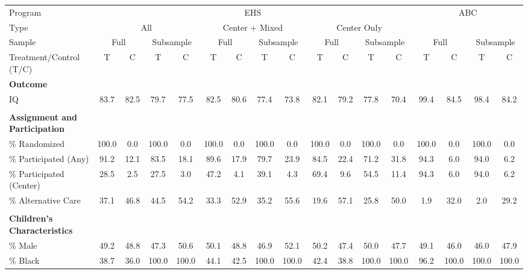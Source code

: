\begin{tabular}{lcccccccccccccccc}
\toprule 
\midrule 
Program & \multicolumn{12}{c}{EHS} & \multicolumn{4}{c}{ABC} \\
 \cmidrule(lr){1-1} \cmidrule(lr){2-13} \cmidrule(lr){14-17} 
Type & \multicolumn{4}{c}{All} & \multicolumn{4}{c}{Center $+$ Mixed} & \multicolumn{4}{c}{Center Only} & \multicolumn{4}{c}{} \\
 \cmidrule(lr){1-1} \cmidrule(lr){2-5} \cmidrule(lr){6-9} \cmidrule(lr){10-13} \cmidrule(lr){14-17} 
Sample & \multicolumn{2}{c}{Full} & \multicolumn{2}{c}{Subsample} & \multicolumn{2}{c}{Full} & \multicolumn{2}{c}{Subsample} & \multicolumn{2}{c}{Full} & \multicolumn{2}{c}{Subsample} & \multicolumn{2}{c}{Full} & \multicolumn{2}{c}{Subsample} \\
 \cmidrule(lr){1-1} \cmidrule(lr){2-3} \cmidrule(lr){4-5} \cmidrule(lr){6-7} \cmidrule(lr){8-9} \cmidrule(lr){10-11} \cmidrule(lr){12-13} \cmidrule(lr){14-15} \cmidrule(lr){16-17} 
Treatment/Control (T/C) & T & C & T & C & T & C & T & C & T & C & T & C & T & C & T & C \\
\midrule 
\textbf{Outcome} \\
\quad IQ & 83.7 & 82.5 & 79.7 & 77.5 & 82.5 & 80.6 & 77.4 & 73.8 & 82.1 & 79.2 & 77.8 & 70.4 & 99.4 & 84.5 & 98.4 & 84.2 \\
 \\
\textbf{Assignment and Participation} \\
\quad \% Randomized & 100.0 & 0.0 & 100.0 & 0.0 & 100.0 & 0.0 & 100.0 & 0.0 & 100.0 & 0.0 & 100.0 & 0.0 & 100.0 & 0.0 & 100.0 & 0.0 \\
\quad \% Participated (Any) & 91.2 & 12.1 & 83.5 & 18.1 & 89.6 & 17.9 & 79.7 & 23.9 & 84.5 & 22.4 & 71.2 & 31.8 & 94.3 & 6.0 & 94.0 & 6.2 \\
\quad \% Participated (Center) & 28.5 & 2.5 & 27.5 & 3.0 & 47.2 & 4.1 & 39.1 & 4.3 & 69.4 & 9.6 & 54.5 & 11.4 & 94.3 & 6.0 & 94.0 & 6.2 \\
\quad \% Alternative Care & 37.1 & 46.8 & 44.5 & 54.2 & 33.3 & 52.9 & 35.2 & 55.6 & 19.6 & 57.1 & 25.8 & 50.0 & 1.9 & 32.0 & 2.0 & 29.2 \\
 \\
\textbf{Children's Characteristics} \\
\quad \% Male & 49.2 & 48.8 & 47.3 & 50.6 & 50.1 & 48.8 & 46.9 & 52.1 & 50.2 & 47.4 & 50.0 & 47.7 & 49.1 & 46.0 & 46.0 & 47.9 \\
\quad \% Black & 38.7 & 36.0 & 100.0 & 100.0 & 44.1 & 42.5 & 100.0 & 100.0 & 42.4 & 38.8 & 100.0 & 100.0 & 96.2 & 100.0 & 100.0 & 100.0 \\

\end{tabular}

